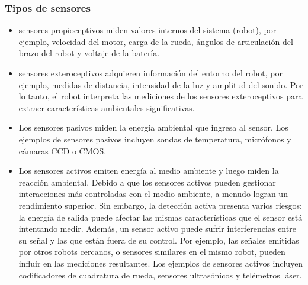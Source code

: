 \begin{frame}
    \frametitle{Tipos de sensores}
    \footnotesize
    \begin{itemize}
    \item sensores propioceptivos miden valores internos del sistema (robot), por ejemplo, velocidad del motor, carga de la rueda, ángulos de articulación del brazo del robot y voltaje de la batería.

    \item sensores exteroceptivos adquieren información del entorno del robot, por ejemplo, medidas de distancia, intensidad de la luz y amplitud del sonido. Por lo tanto, el robot interpreta las mediciones de los sensores exteroceptivos para extraer características ambientales significativas.
    \end{itemize}

    \begin{itemize}
    \item Los sensores pasivos miden la energía ambiental que ingresa al sensor. Los ejemplos de sensores pasivos incluyen sondas de temperatura, micrófonos y cámaras CCD o CMOS.

    \item Los sensores activos emiten energía al medio ambiente y luego miden la reacción ambiental. Debido a que los sensores activos pueden gestionar interacciones más controladas con el medio ambiente, a menudo logran un rendimiento superior. Sin embargo, la detección activa presenta varios riesgos: la energía de salida puede afectar las mismas características que el sensor está intentando medir. Además, un sensor activo puede sufrir interferencias entre su señal y las que están fuera de su control. Por ejemplo, las señales emitidas por otros robots cercanos, o sensores similares en el mismo robot, pueden influir en las mediciones resultantes. Los ejemplos de sensores activos incluyen codificadores de cuadratura de rueda, sensores ultrasónicos y telémetros láser.
\end{itemize}


\end{frame}


